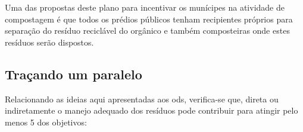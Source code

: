 

Uma das propostas deste plano para incentivar os munícipes na atividade de compostagem é que todos os prédios públicos tenham recipientes próprios para separação do resíduo reciclável do orgânico e também composteiras onde estes resíduos serão dispostos. %


\subsection{Traçando um paralelo}
Relacionando as ideias aqui apresentadas aos \gls{ods}, verifica-se que, direta ou indiretamente o manejo adequado dos resíduos pode contribuir para atingir pelo menos 5 dos objetivos:

